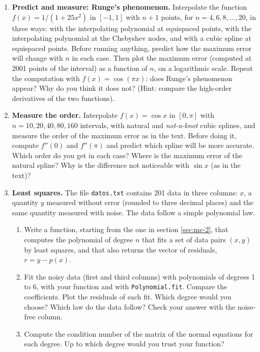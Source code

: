 \begin{enumerate}
\begin{enumerate}
\item \label{ej:intervalos-en} Use \texttt{np.interp}, \texttt{interp1d} with \texttt{kind='nearest'} and \texttt{CubicSpline} (natural and \emph{not-a-knot}) to interpolate the data in the file at 100 equispaced points between $x_0$ and $x_n$, and plot the results in the same figure as in part \ref{ej:vander-en}. Check that your function \texttt{spcubic} gives the same result as \texttt{CubicSpline} with \texttt{bc\_type='natural'}. What value does each method give at $x=1.5$? Which one looks more reasonable to you?
\end{enumerate}

\item \label{ej:runge-en} \textbf{Predict and measure: Runge's phenomenon.} Interpolate the function $f(x)=1/(1+25x^2)$ in $[-1,1]$ with $n+1$ points, for $n=4, 6, 8,\dots, 20$, in three ways: with the interpolating polynomial at equispaced points, with the interpolating polynomial at the Chebyshev nodes, and with a cubic spline at equispaced points. Before running anything, predict how the maximum error will change with $n$ in each case. Then plot the maximum error (computed at 2001 points of the interval) as a function of $n$, on a logarithmic scale. Repeat the computation with $f(x)=\cos(\pi x)$: does Runge's phenomenon appear? Why do you think it does not? (Hint: compare the high-order derivatives of the two functions).

\item \label{ej:orden_spline-en} \textbf{Measure the order.} Interpolate $f(x)=\cos x$ in $[0,\pi]$ with $n=10, 20, 40, 80, 160$ intervals, with natural and \emph{not-a-knot} cubic splines, and measure the order of the maximum error as in the text. Before doing it, compute $f''(0)$ and $f''(\pi)$ and predict which spline will be more accurate. Which order do you get in each case? Where is the maximum error of the natural spline? Why is the difference not noticeable with $\sin x$ (as in the text)?

\item \label{ej:lse-en} \textbf{Least squares.} The file \texttt{datos.txt} contains 201 data in three columns: $x$, a quantity $y$ measured without error (rounded to three decimal places) and the same quantity measured with noise. The data follow a simple polynomial law.
\begin{enumerate}
\item Write a function, starting from the one in section \ref{sec:mc-2}, that computes the polynomial of degree $n$ that fits a set of data pairs $(x, y)$ by least squares, and that also returns the vector of residuals, $r = y -p(x)$.
\item Fit the noisy data (first and third columns) with polynomials of degrees 1 to 6, with your function and with \texttt{Polynomial.fit}. Compare the coefficients. Plot the residuals of each fit. Which degree would you choose? Which law do the data follow? Check your answer with the noise-free column.
\item Compute the condition number of the matrix of the normal equations for each degree. Up to which degree would you trust your function?
\end{enumerate}


\end{enumerate}
